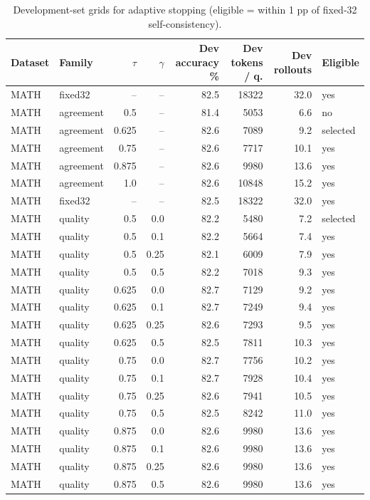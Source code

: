 \begin{table}[t]
\centering
\small
\caption{Development-set grids for adaptive stopping (eligible = within 1 pp of fixed-32 self-consistency).}
\label{tab:t3-grid}
\begin{tabular}{llrrrrrl}
\toprule
Dataset & Family & $\tau$ & $\gamma$ & Dev accuracy \% & Dev tokens / q. & Dev rollouts & Eligible \\
\midrule
MATH & fixed32 & – & – & 82.5 & 18322 & 32.0 & yes \\
MATH & agreement & 0.5 & – & 81.4 & 5053 & 6.6 & no \\
MATH & agreement & 0.625 & – & 82.6 & 7089 & 9.2 & selected \\
MATH & agreement & 0.75 & – & 82.6 & 7717 & 10.1 & yes \\
MATH & agreement & 0.875 & – & 82.6 & 9980 & 13.6 & yes \\
MATH & agreement & 1.0 & – & 82.6 & 10848 & 15.2 & yes \\
MATH & fixed32 & – & – & 82.5 & 18322 & 32.0 & yes \\
MATH & quality & 0.5 & 0.0 & 82.2 & 5480 & 7.2 & selected \\
MATH & quality & 0.5 & 0.1 & 82.2 & 5664 & 7.4 & yes \\
MATH & quality & 0.5 & 0.25 & 82.1 & 6009 & 7.9 & yes \\
MATH & quality & 0.5 & 0.5 & 82.2 & 7018 & 9.3 & yes \\
MATH & quality & 0.625 & 0.0 & 82.7 & 7129 & 9.2 & yes \\
MATH & quality & 0.625 & 0.1 & 82.7 & 7249 & 9.4 & yes \\
MATH & quality & 0.625 & 0.25 & 82.6 & 7293 & 9.5 & yes \\
MATH & quality & 0.625 & 0.5 & 82.5 & 7811 & 10.3 & yes \\
MATH & quality & 0.75 & 0.0 & 82.7 & 7756 & 10.2 & yes \\
MATH & quality & 0.75 & 0.1 & 82.7 & 7928 & 10.4 & yes \\
MATH & quality & 0.75 & 0.25 & 82.6 & 7941 & 10.5 & yes \\
MATH & quality & 0.75 & 0.5 & 82.5 & 8242 & 11.0 & yes \\
MATH & quality & 0.875 & 0.0 & 82.6 & 9980 & 13.6 & yes \\
MATH & quality & 0.875 & 0.1 & 82.6 & 9980 & 13.6 & yes \\
MATH & quality & 0.875 & 0.25 & 82.6 & 9980 & 13.6 & yes \\
MATH & quality & 0.875 & 0.5 & 82.6 & 9980 & 13.6 & yes \\

\end{tabular}
\end{table}
